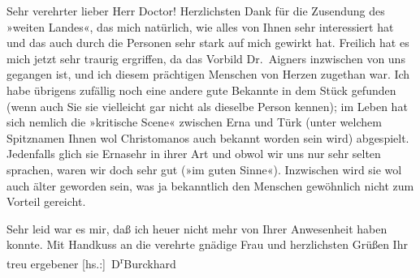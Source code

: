 \pstart{}Sehr verehrter lieber Herr Doctor!\pend\vspace{0.5em}
\pstart
           Herzlichsten Dank für die Zusendung des »weiten
                  Landes«, das mich natürlich, wie alles von Ihnen sehr interessiert hat und
               das auch durch die Personen sehr stark auf mich gewirkt hat. Freilich hat es mich
               jetzt sehr traurig ergriffen, da das Vorbild Dr. Aigners inzwischen von uns gegangen ist, und ich diesem
               prächtigen Menschen von Herzen zugethan war. Ich habe übrigens zufällig noch eine
               andere gute Bekannte in dem Stück gefunden (wenn auch Sie sie vielleicht gar nicht
               als dieselbe Person kennen); im Leben hat sich nemlich die »kritische Scene« zwischen
                  Erna und Türk (unter welchem Spitznamen Ihnen wol
                  Christomanos auch bekannt worden sein wird)
               abgespielt. Jedenfalls glich sie Ernasehr in ihrer Art und obwol wir uns nur sehr selten
               sprachen, waren wir doch sehr gut (»im guten Sinne«). Inzwischen wird sie wol auch
               älter geworden sein, was ja bekanntlich den Menschen gewöhnlich nicht zum Vorteil
               gereicht.\pend
           
\pstart
           Sehr leid war es mir, daß ich heuer nicht mehr von Ihrer Anwesenheit haben konnte.
               Mit Handkuss an die verehrte gnädige Frau und herzlichsten Grüßen Ihr treu ergebener\pend
           \pstart \spacefill\mbox{{[}hs.:{]} D\textsuperscript{r}Burckhard}\pend{}\endnumbering{}  
      